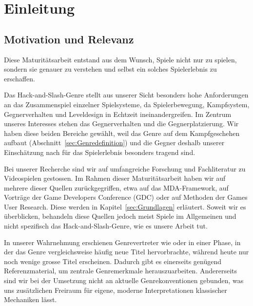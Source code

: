 \documentclass[../Main.tex]{subfiles}
\begin{document}
\section{Einleitung}

\subsection{Motivation und Relevanz}

Diese Maturitätsarbeit entstand aus dem Wunsch, Spiele nicht nur zu spielen, sondern sie genauer zu verstehen und selbst ein solches Spielerlebnis zu erschaffen.

Das Hack-and-Slash-Genre stellt aus unserer Sicht besonders hohe Anforderungen an das Zusammenspiel einzelner Spielsysteme, da Spielerbewegung, Kampfsystem, Gegnerverhalten und Leveldesign in Echtzeit ineinandergreifen. Im Zentrum unseres Interesses stehen das Gegnerverhalten und die Gegnerplatzierung. Wir haben diese beiden Bereiche gewählt, weil das Genre auf dem Kampfgeschehen aufbaut (Abschnitt~\ref{sec:Genredefinition}) und die Gegner deshalb unserer Einschätzung nach für das Spielerlebnis besonders tragend sind.

Bei unserer Recherche sind wir auf umfangreiche Forschung und Fachliteratur zu Videospielen gestossen. Im Rahmen dieser Maturitätsarbeit haben wir auf mehrere dieser Quellen zurückgegriffen, etwa auf das MDA-Framework\autocite{hunicke2004mda}, auf Vorträge der Game Developers Conference (GDC)\autocite{gdc_tenprinciples2010,gdc_leveldesignaday2020,gdc_movingmountains2020,gdc_horizonquests2018} oder auf Methoden der Games User Research\autocite{drachen2018gamesuserresearch}. Diese werden in Kapitel~\ref{sec:Grundlagen} erläutert. Soweit wir es überblicken, behandeln diese Quellen jedoch meist Spiele im Allgemeinen und nicht spezifisch das Hack-and-Slash-Genre, wie es unsere Arbeit tut.

In unserer Wahrnehmung erschienen Genrevertreter wie \autocite{koeitechmo_ninjagaiden_2012} oder \autocite{platinumgames_nierautomata_2017} in einer Phase, in der das Genre vergleichsweise häufig neue Titel hervorbrachte, während heute nur noch wenige grosse Titel erscheinen. Dadurch gibt es einerseits genügend Referenzmaterial, um zentrale Genremerkmale herauszuarbeiten. Andererseits sind wir bei der Umsetzung nicht an aktuelle Genrekonventionen gebunden, was uns zusätzlichen Freiraum für eigene, moderne Interpretationen klassischer Mechaniken lässt.
\end{document}
